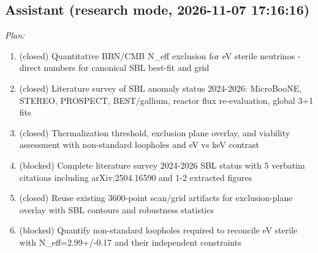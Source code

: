 \documentclass[11pt,a4paper]{article}
\begin{document}
\subsection*{Assistant \small(research mode, 2026-11-07 17:16:16)}
\textit{Plan:}\begin{enumerate}
  \item (closed) Quantitative BBN/CMB N\_eff exclusion for eV sterile neutrinos - direct numbers for canonical SBL best-fit and grid
  \item (closed) Literature survey of SBL anomaly status 2024-2026: MicroBooNE, STEREO, PROSPECT, BEST/gallium, reactor flux re-evaluation, global 3+1 fits
  \item (closed) Thermalization threshold, exclusion plane overlay, and viability assessment with non-standard loopholes and eV vs keV contrast
  \item (blocked) Complete literature survey 2024-2026 SBL status with 5 verbatim citations including arXiv:2504.16590 and 1-2 extracted figures
  \item (closed) Reuse existing 3600-point scan/grid artifacts for exclusion-plane overlay with SBL contours and robustness statistics
  \item (blocked) Quantify non-standard loopholes required to reconcile eV sterile with N\_eff=2.99+/-0.17 and their independent constraints
\end{enumerate}
\end{document}
